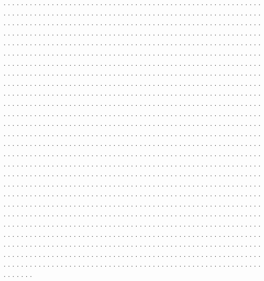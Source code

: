 \documentclass[twocolumn]{revtex4}
\begin{document}
\vspace*{0.5cm}
\noindent
. . . . . . . . . . . . . . . . . . . . . . . . . . . . . . . . . . . . . . . .
. . . . . . . . . . . . . . . . . . . . . . . . . . . . . . . . . . . . . . . .
. . . . . . . . . . . . . . . . . . . . . . . . . . . . . . . . . . . . . . . .
. . . . . . . . . . . . . . . . . . . . . . . . . . . . . . . . . . . . . . . .
. . . . . . . . . . . . . . . . . . . . . . . . . . . . . . . . . . . . . . . .
. . . . . . . . . . . . . . . . . . . . . . . . . . . . . . . . . . . . . . . .
. . . . . . . . . . . . . . . . . . . . . . . . . . . . . . . . . . . . . . . .
. . . . . . . . . . . . . . . . . . . . . . . . . . . . . . . . . . . . . . . .
. . . . . . . . . . . . . . . . . . . . . . . . . . . . . . . . . . . . . . . .
. . . . . . . . . . . . . . . . . . . . . . . . . . . . . . . . . . . . . . . .
. . . . . . . . . . . . . . . . . . . . . . . . . . . . . . . . . . . . . . . .
. . . . . . . . . . . . . . . . . . . . . . . . . . . . . . . . . . . . . . . .
. . . . . . . . . . . . . . . . . . . . . . . . . . . . . . . . . . . . . . . .
. . . . . . . . . . . . . . . . . . . . . . . . . . . . . . . . . . . . . . . .
. . . . . . . . . . . . . . . . . . . . . . . . . . . . . . . . . . . . . . . .
. . . . . . . . . . . . . . . . . . . . . . . . . . . . . . . . . . . . . . . .
. . . . . . . . . . . . . . . . . . . . . . . . . . . . . . . . . . . . . . . .
. . . . . . . . . . . . . . . . . . . . . . . . . . . . . . . . . . . . . . . .
. . . . . . . . . . . . . . . . . . . . . . . . . . . . . . . . . . . . . . . .
. . . . . . . . . . . . . . . . . . . . . . . . . . . . . . . . . . . . . . . .
. . . . . . . . . . . . . . . . . . . . . . . . . . . . . . . . . . . . . . . .
. . . . . . . . . . . . . . . . . . . . . . . . . . . . . . . . . . . . . . . .
. . . . . . . . . . . . . . . . . . . . . . . . . . . . . . . . . . . . . . . .
. . . . . . . . . . . . . . . . . . . . . . . . . . . . . . . . . . . . . . . .
. . . . . . . . . . . . . . . . . . . . . . . . . . . . . . . . . . . . . . . .
. . . . . . . . . . . . . . . . . . . . . . . . . . . . . . . . . . . . . . . .
. . . . . . . . . . . . . . . . . . . . . . . . . . . . . . . . . . . . . . . .
. . . . . . . . . . . . . . . . . . . . . . . . . . . . . . . . . . . . . . . .
. . . . . . . . . . . . . . . . . . . . . . . . . . . . . . . . . . . . . . . .
. . . . . . . . . . . . . . . . . . . . . . . . . . . . . . . . . . . . . . . .
. . . . . . . . . . . . . . . . . . . . . . . . . . . . . . . . . . . . . . . .
. . . . . . . . . . . . . . . . . . . . . . . . . . . . . . . . . . . . . . . .
. . . . . . . . . . . . . . . . . . . . . . . . . . . . . . . . . . . . . . . .
. . . . . . . . . . . . . . . . . . . . . . . . . . . . . . . . . . . . . . . .
. . . . . . . . . . . . . . . . . . . . . . . . . . . . . . . . . . . . . . . .
. . . . . . . . . . . . . . . . . . . . . . . . . . . . . . . . . . . . . . . .
. . . . . . . . . . . . . . . . . . . . . . . . . . . . . . . . . . . . . . . .
. . . . . . . . . . . . . . . . . . . . . . . . . . . . . . . . . . . . . . . .
. . . . . . . . . . . . . . . . . . . . . . . . . . . . . . . . . . . . . . . .
. . . . . . . . . . . . . . . . . . . . . . . . . . . . . . . . . . . . . . . .
\end{document}
